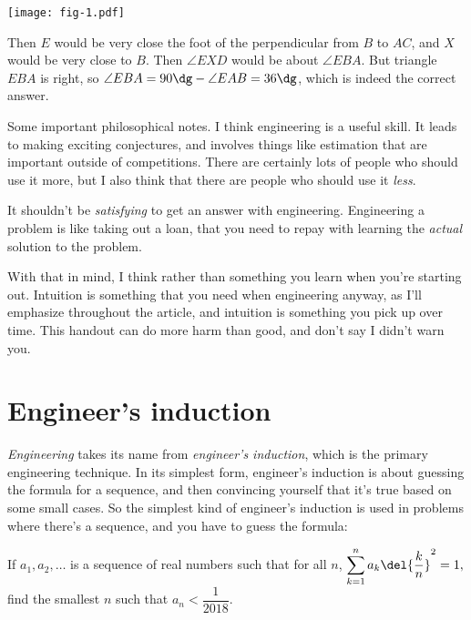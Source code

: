 \documentclass[11pt,paper=letter]{scrartcl}
\begin{document}
\begin{center}
\texttt{[image: fig-1.pdf]}
\end{center}

Then $E$ would be very close the foot of the perpendicular from $B$ to $AC$, and $X$ would be very close to $B$. Then $\angle EXD$ would be about $\angle EBA$. But triangle $EBA$ is right, so $\angle EBA = 90\dg - \angle EAB = 36\dg$, which is indeed the correct answer.

Some important philosophical notes. I think engineering is a useful skill. It leads to making exciting conjectures, and involves things like estimation that are important outside of competitions. There are certainly lots of people who should use it more, but I also think that there are people who should use it \textit{less}.

 It shouldn't be \textit{satisfying} to get an answer with engineering. Engineering a problem is like taking out a loan, that you need to repay with learning the \textit{actual} solution to the problem.

With that in mind, I think  rather than something you learn when you're starting out. Intuition is something that you need when engineering anyway, as I'll emphasize throughout the article, and intuition is something you pick up over time. This handout can do more harm than good, and don't say I didn't warn you.

\section{Engineer's induction}

\emph{Engineering} takes its name from \emph{engineer's induction}, which is the primary engineering technique. In its simplest form, engineer's induction is about guessing the formula for a sequence, and then convincing yourself that it's true based on some small cases. So the simplest kind of engineer's induction is used in problems where there's a sequence, and you have to guess the formula:

\begin{exboxed}
  If $a_1, a_2, \ldots$ is a sequence of real numbers such that for all $n$, $\displaystyle \sum_{k=1}^{n} a_k\del{\frac kn}^2 = 1,$ find the smallest $n$ such that $a_n < \dfrac1{2018}$.
\end{exboxed}
\end{document}
